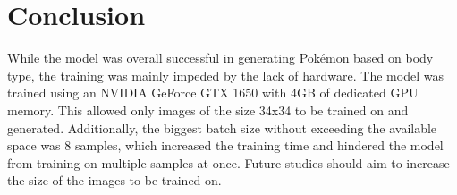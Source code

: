 \documentclass[12pt]{article}
\theoremstyle{plain}
\theoremstyle{definition}
\theoremstyle{remark}
\begin{document}
\section{Conclusion}
\label{sec:conclusion}

While the model was overall successful in generating Pokémon based on body type, the training was mainly impeded by the lack of hardware. The model was trained using an NVIDIA GeForce GTX 1650 with 4GB of dedicated GPU memory. This allowed only images of the size 34x34 to be trained on and generated. Additionally, the biggest batch size without exceeding the available space was 8 samples, which increased the training time and hindered the model from training on multiple samples at once. Future studies should aim to increase the size of the images to be trained on.

%
%
\newpage
\printbibliography[heading=bibintoc]
\end{document}
